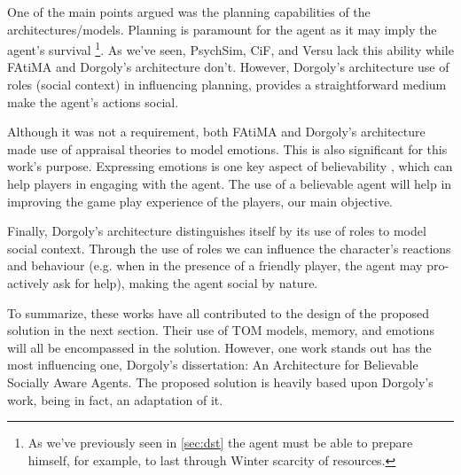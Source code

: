 One of the main points argued was the planning capabilities of the architectures/models.
Planning is paramount for the agent as it may imply the agent's survival \footnote{As we've previously seen in \ref{sec:dst} the agent must be able to prepare himself, for example, to last through Winter scarcity of resources. }.
As we've seen, PsychSim, \ac{CiF}, and Versu lack this ability while \ac{FAtiMA} and Dorgoly's architecture don't.
However, Dorgoly's architecture use of roles (social context) in influencing planning, provides a straightforward medium make the agent's actions social.

Although it was not a requirement, both \ac{FAtiMA} and Dorgoly's architecture made use of appraisal theories to model emotions.
This is also significant for this work's purpose.
Expressing emotions is one key aspect of believability \cite{bates:believable-agents}, which can help players in engaging with the agent.
The use of a believable agent will help in improving the game play experience of the players, our main objective.

Finally, Dorgoly's architecture distinguishes itself by its use of roles to model social context.
Through the use of roles we can influence the character's reactions and behaviour (e.g. when in the presence of a friendly player, the agent may pro-actively ask for help), making the agent social by nature.

To summarize, these works have all contributed to the design of the proposed solution in the next section.
Their use of \ac{TOM} models, memory, and emotions will all be encompassed in the solution.
However, one work stands out has the most influencing one, Dorgoly's dissertation: An Architecture for Believable Socially Aware Agents.
The proposed solution is heavily based upon Dorgoly's  work, being in fact, an adaptation of it.